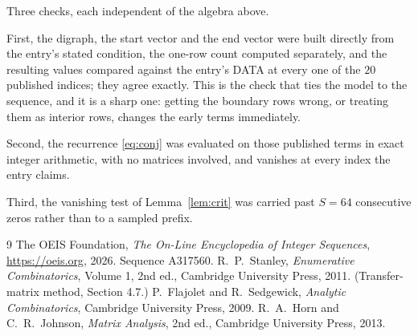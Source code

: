 \documentclass[11pt,a4paper]{article}
\theoremstyle{plain}
\theoremstyle{definition}
\begin{document}
Three checks, each independent of the algebra above.

First, the digraph, the start vector and the end vector were built directly from the
entry's stated condition, the one-row count computed separately, and the resulting values
compared against the entry's DATA at every one of the $20$ published indices; they
agree exactly. This is the check that ties the model to the sequence, and it is a sharp one:
getting the boundary rows wrong, or treating them as interior rows, changes the early terms
immediately.

Second, the recurrence \eqref{eq:conj} was evaluated on those published terms in exact
integer arithmetic, with no matrices involved, and vanishes at every index the entry claims.

Third, the vanishing test of Lemma~\ref{lem:crit} was carried past $S=64$ consecutive
zeros rather than to a sampled prefix.

\begin{thebibliography}{9}
 The OEIS Foundation, \emph{The On-Line Encyclopedia of Integer
Sequences}, \url{https://oeis.org}, 2026. Sequence A317560.
 R.~P.~Stanley, \emph{Enumerative Combinatorics}, Volume 1, 2nd ed.,
Cambridge University Press, 2011. (Transfer-matrix method, Section 4.7.)
 P.~Flajolet and R.~Sedgewick, \emph{Analytic Combinatorics}, Cambridge
University Press, 2009.
 R.~A.~Horn and C.~R.~Johnson, \emph{Matrix Analysis}, 2nd ed., Cambridge
University Press, 2013.
\end{thebibliography}
\end{document}
